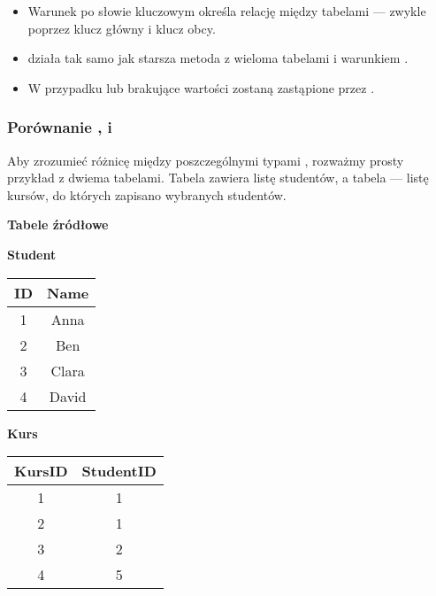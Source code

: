 \begin{tcolorbox}[blue={Wskazówka dotycząca JOIN}]
\begin{itemize}
    \item Warunek po słowie kluczowym  określa relację między tabelami — zwykle poprzez klucz główny i klucz obcy.
    \item {} działa tak samo jak starsza metoda z wieloma tabelami i warunkiem .
    \item W przypadku  lub  brakujące wartości zostaną zastąpione przez .
\end{itemize}
\end{tcolorbox}

\subsubsection{Porównanie ,  i }

Aby zrozumieć różnicę między poszczególnymi typami , rozważmy prosty przykład z dwiema tabelami.  
Tabela  zawiera listę studentów, a tabela  — listę kursów, do których zapisano wybranych studentów.

\begin{table}[H]
    \centering
    \textbf{Tabele źródłowe} \\ [10pt]
    \begin{minipage}[t]{0.4\textwidth}
        \centering
        \textbf{Student} \\[3pt]
        \begin{tabular}{|c|c|}
            \hline
            \textbf{ID} & \textbf{Name} \\
            \hline
            1 & Anna \\
            2 & Ben \\
            3 & Clara \\
            4 & David \\ %
            \hline
        \end{tabular}
    \end{minipage}
    \hspace{0.3cm}
    \begin{minipage}[t]{0.4\textwidth}
        \centering
        \textbf{Kurs} \\ [3pt]
        \begin{tabular}{|c|c|}
            \hline
            \textbf{KursID} & \textbf{StudentID} \\
            \hline
            1 & 1 \\
            2 & 1 \\
            3 & 2 \\
            4 & 5 \\ %
            \hline
        \end{tabular}
    \end{minipage}
\end{table}

